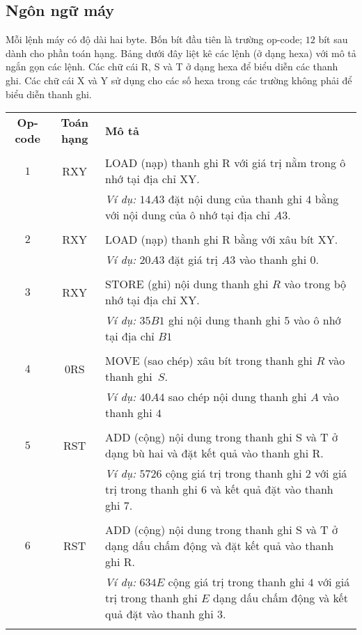 \subsection*{Ngôn ngữ máy}
Mỗi lệnh máy có độ dài hai byte. Bốn bít đầu tiên là trường op-code; $12$ bít sau dành cho
phần toán hạng. Bảng dưới đây liệt kê các lệnh (ở dạng hexa) với mô tả ngắn gọn các
lệnh. Các chữ cái R, S và T ở dạng hexa để biểu diễn các thanh ghi. Các chữ cái X và Y sử
dụng cho các số hexa trong các trường không phải để biểu diễn thanh ghi.  
\begin{longtable}{ccm{10cm}} 
  \textbf{Op-code} & \textbf{Toán hạng} & \textbf{Mô tả} \\ \\
 
  $1$ & RXY & LOAD (nạp) thanh ghi R với giá trị nằm trong ô nhớ tại
  địa chỉ XY.                                      \\
  & & \textit{Ví dụ:} $14A3$ đặt nội dung của thanh ghi $4$ bằng với
  nội dung của ô nhớ tại
  địa chỉ $A3$. \\\\
   
  $2$ & RXY & LOAD (nạp) thanh ghi R bằng với xâu bít XY. \\
  & & \textit{Ví dụ:} $20A3$ đặt giá trị $A3$ vào thanh ghi $0$. \\ \\

  $3$ & RXY & STORE (ghi) nội dung thanh ghi $R$ vào trong bộ nhớ tại địa chỉ XY. \\
  & & \textit{Ví dụ:} $35B1$ ghi nội dung thanh ghi $5$ vào ô nhớ tại địa chỉ $B1$ \\ \\

  $4$ & 0RS & MOVE (sao chép) xâu bít trong thanh ghi $R$ vào thanh ghi~$S$.\\
  & & \textit{Ví dụ:} $40A4$ sao chép nội dung thanh ghi  $A$ vào thanh ghi $4$ \\ \\

  $5$ & RST & ADD (cộng) nội dung trong thanh ghi S và T ở dạng bù hai
  và đặt kết quả vào
  thanh ghi R. \\
  & & \textit{Ví dụ:} $5726$ cộng giá trị trong thanh ghi $2$ với giá
  trị trong thanh ghi
  $6$ và kết quả đặt vào thanh ghi $7$. \\ \\


  $6$ & RST & ADD (cộng) nội dung trong thanh ghi S và T ở dạng dấu
  chấm động và đặt kết quả vào
  thanh ghi R. \\
  & & \textit{Ví dụ:} $634E$ cộng giá trị trong thanh ghi $4$ với giá
  trị trong thanh ghi
  $E$ dạng dấu chấm động và kết quả đặt vào thanh ghi $3$. \\ \\


\end{longtable}
